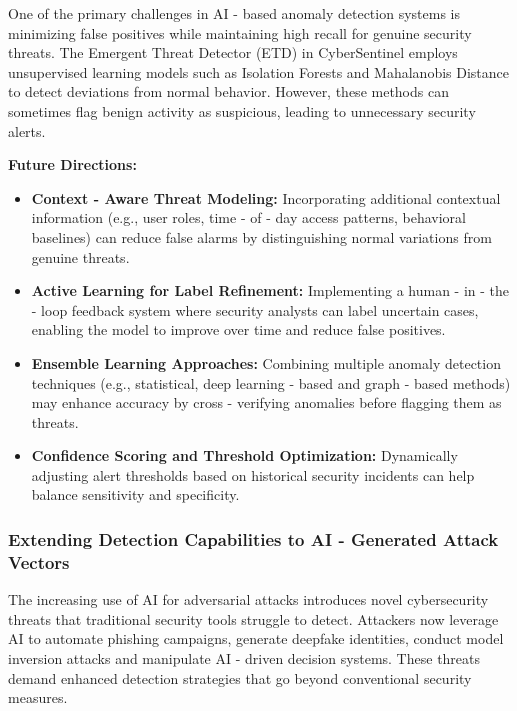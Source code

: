 \documentclass{article}
\begin{document}
One of the primary challenges in AI - based anomaly detection systems is minimizing false positives while maintaining high recall for genuine security threats. The Emergent Threat Detector (ETD) in CyberSentinel employs unsupervised learning models such as Isolation Forests and Mahalanobis Distance to detect deviations from normal behavior. However, these methods can sometimes flag benign activity as suspicious, leading to unnecessary security alerts.

\textbf{Future Directions:}
\begin{itemize}
    \item \textbf{Context - Aware Threat Modeling:} Incorporating additional contextual information (e.g., user roles, time - of - day access patterns, behavioral baselines) can reduce false alarms by distinguishing normal variations from genuine threats.
    \item \textbf{Active Learning for Label Refinement:} Implementing a human - in - the - loop feedback system where security analysts can label uncertain cases, enabling the model to improve over time and reduce false positives.
    \item \textbf{Ensemble Learning Approaches:} Combining multiple anomaly detection techniques (e.g., statistical, deep learning - based and graph - based methods) may enhance accuracy by cross - verifying anomalies before flagging them as threats.
    \item \textbf{Confidence Scoring and Threshold Optimization:} Dynamically adjusting alert thresholds based on historical security incidents can help balance sensitivity and specificity.
\end{itemize}

\subsubsection{Extending Detection Capabilities to AI - Generated Attack Vectors}

The increasing use of AI for adversarial attacks introduces novel cybersecurity threats that traditional security tools struggle to detect. Attackers now leverage AI to automate phishing campaigns, generate deepfake identities, conduct model inversion attacks and manipulate AI - driven decision systems. These threats demand enhanced detection strategies that go beyond conventional security measures.
\end{document}
